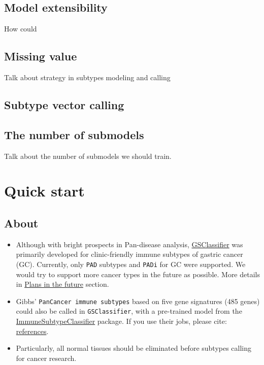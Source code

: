 \documentclass[
  12pt,
]{book}
\providecommand{\tightlist}{%
  \setlength{\itemsep}{0pt}\setlength{\parskip}{0pt}}
\begin{document}
\hypertarget{model-extensibility}{%
\section{Model extensibility}\label{model-extensibility}}

How could

\hypertarget{missing-value}{%
\section{Missing value}\label{missing-value}}

Talk about strategy in subtypes modeling and calling

\hypertarget{subtypevector}{%
\section{Subtype vector calling}\label{subtypevector}}

\hypertarget{topicSubmodel}{%
\section{The number of submodels}\label{topicSubmodel}}

Talk about the number of submodels we should train.

\hypertarget{quick-start}{%
\chapter{Quick start}\label{quick-start}}

\hypertarget{about}{%
\section{About}\label{about}}

\begin{itemize}
\tightlist
\item
  Although with bright prospects in Pan-disease analysis, \href{https://github.com/huangwb8/GSClassifier}{GSClassifier} was primarily developed for clinic-friendly immune subtypes of gastric cancer (GC). Currently, only \texttt{PAD} subtypes and \texttt{PADi} for GC were supported. We would try to support more cancer types in the future as possible. More details in \href{https://github.com/huangwb8/GSClassifier/wiki/Plans-in-the-future}{Plans in the future} section.
\item
  Gibbs' \texttt{PanCancer\ immune\ subtypes} based on five gene signatures (485 genes) could also be called in \texttt{GSClassifier}, with a pre-trained model from the \href{https://github.com/CRI-iAtlas/ImmuneSubtypeClassifier}{ImmuneSubtypeClassifier} package. If you use their jobs, please cite: \href{https://github.com/huangwb8/GSClassifier/wiki/Introduction\#Reference}{references}.
\item
  Particularly, all normal tissues should be eliminated before subtypes calling for cancer research.
\end{itemize}
\end{document}

